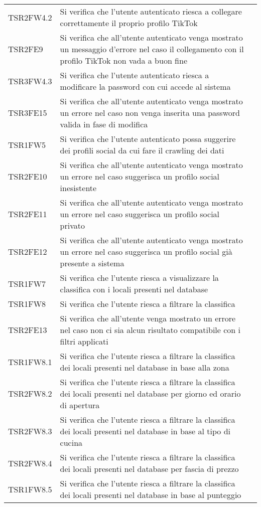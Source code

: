 \begin{longtable}{ m{}<{\centering}  m{}<{\centering}  m{}<{\centering} }
	TSR2FW4.2 & Si verifica che l'utente autenticato riesca a collegare correttamente il proprio profilo TikTok & \Ni \\
	TSR2FE9 & Si verifica che all'utente autenticato venga mostrato un messaggio d'errore nel caso il collegamento con il profilo TikTok non vada a buon fine & \Ni \\
	TSR3FW4.3 & Si verifica che l'utente autenticato riesca a modificare la password con cui accede al sistema & \Ni \\
	TSR3FE15 & Si verifica che all'utente autenticato venga mostrato un errore nel caso non venga inserita una password valida in fase di modifica & \Ni \\
	TSR1FW5 & Si verifica che l'utente autenticato possa suggerire dei profili social da cui fare il crawling dei dati & \Ni \\
	TSR2FE10 & Si verifica che all'utente autenticato venga mostrato un errore nel caso suggerisca un profilo social inesistente & \Ni \\
	TSR2FE11 & Si verifica che all'utente autenticato venga mostrato un errore nel caso suggerisca un profilo social privato & \Ni \\
	TSR2FE12 & Si verifica che all'utente autenticato venga mostrato un errore nel caso suggerisca un profilo social già  presente a sistema & \Ni \\
	TSR1FW7 & Si verifica che l'utente riesca a visualizzare la classifica con i locali presenti nel database & \Ni \\
	TSR1FW8 & Si verifica che l'utente riesca a filtrare la classifica & \Ni \\
	TSR2FE13 & Si verifica che all'utente venga mostrato un errore nel caso non ci sia alcun risultato compatibile con i filtri applicati & \Ni \\
	TSR1FW8.1 & Si verifica che l'utente riesca a filtrare la classifica dei locali presenti nel database in base alla zona & \Ni \\
	TSR2FW8.2 & Si verifica che l'utente riesca a filtrare la classifica dei locali presenti nel database per giorno ed orario di apertura & \Ni \\
	TSR2FW8.3 & Si verifica che l'utente riesca a filtrare la classifica dei locali presenti nel database in base al tipo di cucina & \Ni \\
	TSR2FW8.4 & Si verifica che l'utente riesca a filtrare la classifica dei locali presenti nel database per fascia di prezzo & \Ni \\
	TSR1FW8.5 & Si verifica che l'utente riesca a filtrare la classifica dei locali presenti nel database in base al punteggio & \Ni \\

\end{longtable}

